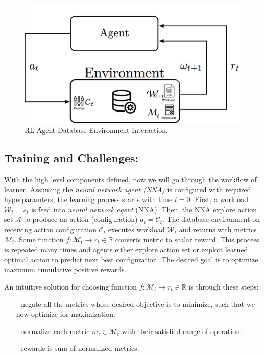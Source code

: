 \begin{figure}[h]
  \vspace{-3mm}
	\includegraphics[width=\linewidth ]{fig/database_agent.png}
    \vspace{-5mm}
    \caption{RL Agent-Database Environment Interaction.}
    \label{fig:database_agent}
    \vspace{-5mm}
\end{figure}


\subsection*{Training and Challenges:}
With the high level components defined, now we will go through the workflow of learner.
Assuming the {\em neural network agent (NNA) } is configured with required hyperparamters, the learning process starts with time $t=0$.
First, a workload $\mathcal{W}_t = s_t$  is feed into {\em neural network agent} (NNA). Then, the NNA explore action set $\mathcal{A}$ to produce an action (configuration) $a_t = \mathcal{C}_t$. The database environment on receiving action configuration $\mathcal{C}_t$ executes workload $\mathcal{W}_t$ and returns with metrics $\mathcal{M}_t$. Some function $f: \mathcal{M}_t \rightarrow r_t \in \mathbb{R}$ converts metric to scalar reward. This process is repeated many times and agents either explore action set or exploit learned optimal action to predict next best configuration. The desired goal is to optimize maximum cumulative positive rewards.

An intuitive solution for choosing function $f: \mathcal{M}_t \rightarrow r_t \in \mathbb{R}$ is  through these steps:\\
\vspace{-4mm}
\begin{itemize}
  \item[-] negate all the metrics whose desired objective is to minimize, such that we now optimize for maximization.
  \item[-] normalize each metric $m_i \in \mathcal{M}_t$ with their satisfied range of operation.
  \item[-] rewards is sum  of normalized metrics.
\end{itemize}

